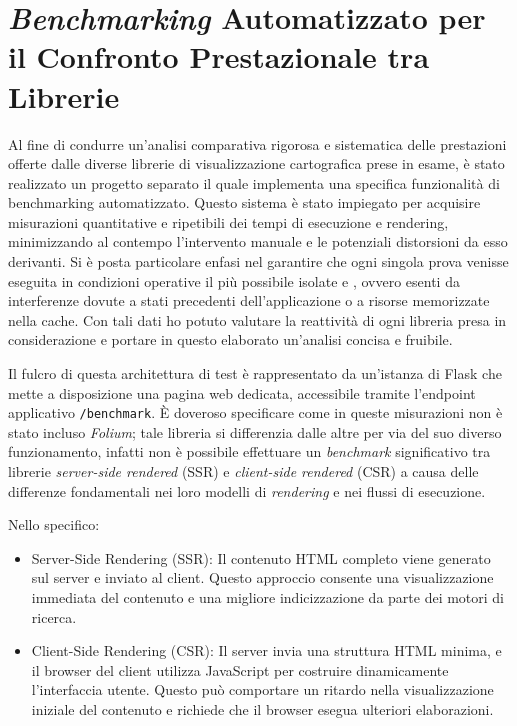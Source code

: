 \section{\textit{Benchmarking} Automatizzato per il Confronto Prestazionale tra Librerie}

Al fine di condurre un'analisi comparativa rigorosa e sistematica delle prestazioni offerte dalle diverse librerie di visualizzazione cartografica prese in esame, è stato realizzato un progetto separato il quale implementa una specifica funzionalità di benchmarking automatizzato. Questo sistema è stato impiegato per acquisire misurazioni quantitative e ripetibili dei tempi di esecuzione e rendering, minimizzando al contempo l'intervento manuale e le potenziali distorsioni da esso derivanti. Si è posta particolare enfasi nel garantire che ogni singola prova venisse eseguita in condizioni operative il più possibile isolate e , ovvero esenti da interferenze dovute a stati precedenti dell'applicazione o a risorse memorizzate nella cache.
Con tali dati ho potuto valutare la reattività di ogni libreria presa in considerazione e portare in questo elaborato un'analisi concisa e fruibile.

Il fulcro di questa architettura di test è rappresentato da un'istanza di Flask che mette a disposizione una pagina web dedicata, accessibile tramite l'endpoint applicativo \texttt{/benchmark}. 
È doveroso specificare come in queste misurazioni non è stato incluso \textit{Folium}; tale libreria si differenzia dalle altre per via del suo diverso funzionamento, infatti non è possibile effettuare un \textit{benchmark} significativo tra librerie \textit{server-side rendered} (SSR) e \textit{client-side rendered} (CSR) a causa delle differenze fondamentali nei loro modelli di \textit{rendering} e nei flussi di esecuzione. 

Nello specifico:
\begin{itemize}
      \item Server-Side Rendering (SSR): Il contenuto HTML completo viene generato sul server e inviato al client. Questo approccio consente una visualizzazione immediata del contenuto e una migliore indicizzazione da parte dei motori di ricerca.\cite{peerdh-ssr-csr-comparison}

    \item Client-Side Rendering (CSR): Il server invia una struttura HTML minima, e il browser del client utilizza JavaScript per costruire dinamicamente l'interfaccia utente. Questo può comportare un ritardo nella visualizzazione iniziale del contenuto e richiede che il browser esegua ulteriori elaborazioni.\cite{devto-csr-vs-ssr}
\end{itemize}
  

